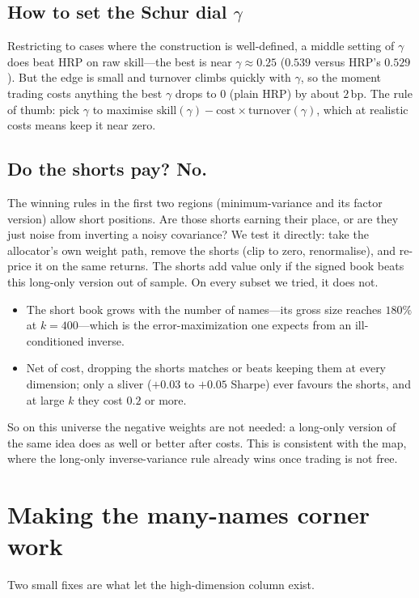 \documentclass[11pt]{article}
\begin{document}
\subsection{How to set the Schur dial $\gamma$}
Restricting to cases where the construction is well-defined, a middle setting of
$\gamma$ does beat HRP on raw skill---the best is near $\gamma\approx0.25$
($0.539$ versus HRP's $0.529$). But the edge is small and turnover climbs quickly
with $\gamma$, so the moment trading costs anything the best $\gamma$ drops to $0$
(plain HRP) by about $2$\,bp. The rule of thumb: pick $\gamma$ to maximise
$\text{skill}(\gamma)-\text{cost}\times\text{turnover}(\gamma)$, which at
realistic costs means keep it near zero.

\subsection{Do the shorts pay? No.}
The winning rules in the first two regions (minimum-variance and its factor
version) allow short positions. Are those shorts earning their place, or are they
just noise from inverting a noisy covariance? We test it directly: take the
allocator's own weight path, remove the shorts (clip to zero, renormalise), and
re-price it on the same returns. The shorts add value only if the signed book
beats this long-only version out of sample. On every subset we tried, it does not.
\begin{itemize}
  \item The short book grows with the number of names---its gross size reaches
    $180\%$ at $k{=}400$---which is the error-maximization one expects from an
    ill-conditioned inverse.
  \item Net of cost, dropping the shorts matches or beats keeping them at every
    dimension; only a sliver ($+0.03$ to $+0.05$ Sharpe) ever favours the shorts,
    and at large $k$ they cost $0.2$ or more.
\end{itemize}
So on this universe the negative weights are not needed: a long-only version of
the same idea does as well or better after costs. This is consistent with the
map, where the long-only inverse-variance rule already wins once trading is not
free.

\section{Making the many-names corner work}\label{sec:wellposed}
Two small fixes are what let the high-dimension column exist.
\end{document}

